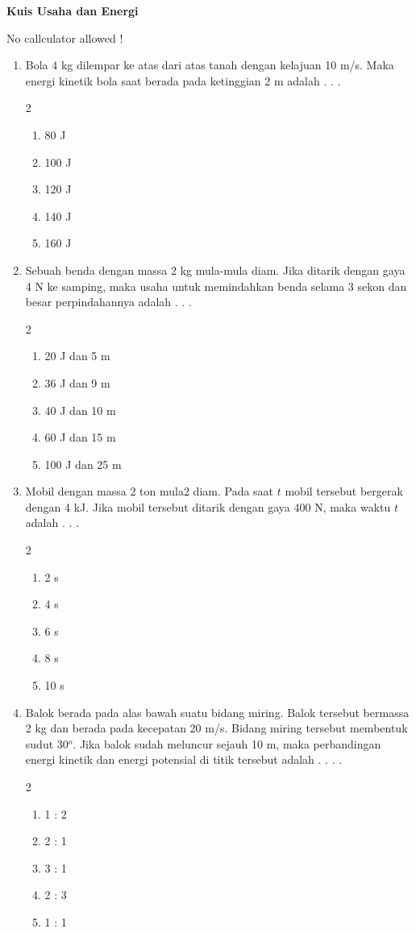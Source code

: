 \documentclass[14pt,a4paper]{extarticle}
\newcommand{\pilgani}[1]{                            \vspace{-0.3cm}\begin{multicols}{2}
 \begin{enumerate}[label=\Alph*., itemsep=0pt,topsep=0pt,leftmargin=*,align=Center]#1                     \end{enumerate}
 \phantom{ini cuma sapi, wedus, dan ayam}
 \end{multicols}}
\begin{document}
 \textbf{Kuis Usaha dan Energi} \phantom{ini nama siswa yang aaamengerjakan soal kuis ini }  

No callculator allowed !  

\begin{enumerate}

\item Bola 4 kg dilempar ke atas dari atas tanah dengan kelajuan 10 m/s. Maka energi kinetik bola saat berada pada ketinggian 2 m adalah . . . 
    \pilgani{
        \item 80 J
        \item 100 J
        \item 120 J
        \item 140 J
        \item 160 J }
        
\item Sebuah benda dengan massa 2 kg mula-mula diam. Jika ditarik dengan gaya 4 N ke samping, maka usaha untuk memindahkan benda selama 3 sekon dan besar perpindahannya adalah . . . 
    \pilgani{
        \item 20 J dan 5 m
        \item 36 J dan 9 m
        \item 40 J dan 10 m
        \item 60 J dan 15 m
        \item 100 J dan 25 m
    }


\item Mobil dengan massa 2 ton mula2 diam. Pada saat $t$ mobil tersebut bergerak dengan 4 kJ. Jika mobil tersebut ditarik dengan gaya 400 N, maka waktu $t$ adalah . . . 
    \pilgani{
        \item 2 s
        \item 4 s
        \item 6 s
        \item 8 s
        \item 10 s
    }

\item Balok berada pada alas bawah suatu bidang miring. Balok tersebut bermassa 2 kg dan berada pada kecepatan 20 m/s. Bidang miring tersebut membentuk sudut 30$^o$. Jika balok sudah meluncur sejauh 10 m, maka perbandingan energi kinetik dan energi potensial di titik tersebut adalah . . . .
    \pilgani{
        \item 1 : 2
        \item 2 : 1
        \item 3 : 1 
        \item 2 : 3
        \item 1 : 1
    }


\end{enumerate}
\end{document}
